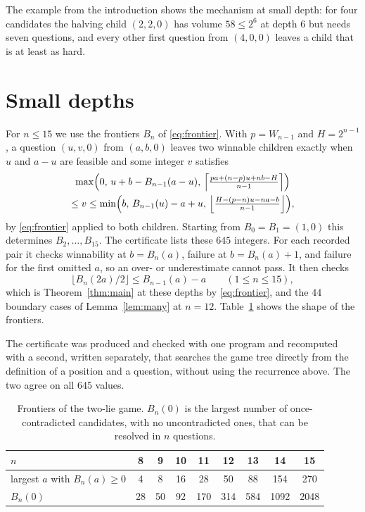 \documentclass[11pt]{amsart}
\theoremstyle{definition}
\begin{document}
The example from the introduction shows the mechanism at small depth: for four candidates the halving child
$(2,2,0)$ has volume $58\le2^6$ at depth $6$ but needs seven questions, and every other first question from $(4,0,0)$ leaves
a child that is at least as hard.

\section{Small depths}\label{sec:base}

For $n\le15$ we use the frontiers $B_n$ of \eqref{eq:frontier}. With $p=W_{n-1}$ and $H=2^{n-1}$, a question $(u,v,0)$
from $(a,b,0)$ leaves two winnable children exactly when $u$ and $a-u$ are feasible and some integer $v$ satisfies
\begin{multline*}
\max\Bigl(0,\,u+b-B_{n-1}(a-u),\,\Bigl\lceil\tfrac{pa+(n-p)u+nb-H}{n-1}\Bigr\rceil\Bigr)\\
\le v\le\min\Bigl(b,\,B_{n-1}(u)-a+u,\,\Bigl\lfloor\tfrac{H-(p-n)u-na-b}{n-1}\Bigr\rfloor\Bigr),
\end{multline*}
by \eqref{eq:frontier} applied to both children. Starting from $B_0=B_1=(1,0)$ this determines $B_2,\dots,B_{15}$.
The certificate lists these $645$ integers. For each recorded pair it checks winnability at $b=B_n(a)$, failure at
$b=B_n(a)+1$, and failure for the first omitted $a$, so an over- or underestimate cannot pass. It then checks
\[
\bigl\lfloor B_n(2a)/2\bigr\rfloor\le B_{n-1}(a)-a\qquad(1\le n\le15),
\]
which is Theorem~\ref{thm:main} at these depths by \eqref{eq:frontier}, and the $44$ boundary cases of
Lemma~\ref{lem:many} at $n=12$. Table~\ref{tab:frontier} shows the shape of the frontiers.

The certificate was produced and checked with one program and recomputed with a second, written separately, that
searches the game tree directly from the definition of a position and a question, without using the recurrence above.
The two agree on all $645$ values.

\begin{table}[h]
\centering\small
\begin{tabular}{@{}l*{8}{c}@{}}
\toprule
$n$ & 8 & 9 & 10 & 11 & 12 & 13 & 14 & 15\\
\midrule
largest $a$ with $B_n(a)\ge0$ & 4 & 8 & 16 & 28 & 50 & 88 & 154 & 270\\
$B_n(0)$ & 28 & 50 & 92 & 170 & 314 & 584 & 1092 & 2048\\
\bottomrule
\end{tabular}
\caption{Frontiers of the two-lie game. $B_n(0)$ is the largest number of once-contradicted candidates, with no
uncontradicted ones, that can be resolved in $n$ questions.}\label{tab:frontier}
\end{table}
\end{document}
